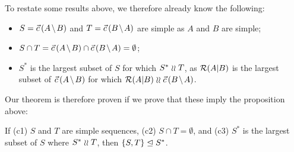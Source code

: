To restate some results above, we therefore already know the following:
\begin{itemize}
\item $S=\amb$ and $T=\bma$ are simple as $A$ and $B$ are simple;
\item $S\cap T = \amb \cap \bma = \emptyset$;
\item $S^*$ is the largest subset of $S$ for which $S^*\mathrel{\wr\wr} T$, as
$\mathcal{R}({A}|{B})$ is the largest subset of $\amb$ for which $\reca\indep\bma$.
\end{itemize}
Our theorem is therefore proven if we prove that these imply the proposition above:
\newcommand{\condSimple}{(c1)}
\newcommand{\condDisj}{(c2)}
\newcommand{\condApr}{(c3)}
\begin{mylem}
If
{\rm\condSimple} $S$ and $T$ are simple sequences,
{\rm\condDisj} $S\cap T=\emptyset$,
and {\rm\condApr} $S^*$ is the largest subset of $S$ where $S^*\mathrel{\wr\wr} T$,
then
${\{{S,T}\}}\trianglelefteq{S^*}$.
\end{mylem}
